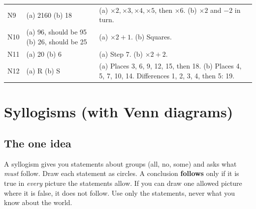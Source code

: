 \documentclass[11pt,a4paper]{article}
\let\oldsubsection\subsection
\renewcommand{\subsection}{\needspace{9\baselineskip}\oldsubsection}
\newif\ifkeepsamp
\begin{document}
\begin{center}
\begin{tabularx}{\linewidth}{@{}l>{\raggedright\arraybackslash}p{3.4cm}>{\raggedright\arraybackslash}X@{}}
N9 & (a) 2160 \newline (b) 18 & (a) $\times 2, \times 3, \times 4, \times 5$, then $\times 6$. \newline (b) $\times 2$ and $-2$ in turn. \\
N10 & (a) 96, should be 95 \newline (b) 26, should be 25 & (a) $\times 2 + 1$. \newline (b) Squares. \\
N11 & (a) 20 \newline (b) 6 & (a) Step 7. \newline (b) $\times 2 + 2$. \\
N12 & (a) R \newline (b) S & (a) Places 3, 6, 9, 12, 15, then 18. \newline (b) Places 4, 5, 7, 10, 14. Differences 1, 2, 3, 4, then 5: 19. \\
\bottomrule
\end{tabularx}\end{center}

\clearpage
\keepsamptrue
\section[Syllogisms (Y1--Y12)]{Syllogisms (with Venn diagrams)}\label{ch:Y}

\subsection*{The one idea}
A syllogism gives you statements about groups (all, no, some) and asks what \emph{must} follow. Draw each statement as circles. A conclusion \textbf{follows} only if it is true in \emph{every} picture the statements allow. If you can draw one allowed picture where it is false, it does not follow. Use only the statements, never what you know about the world.
\end{document}
